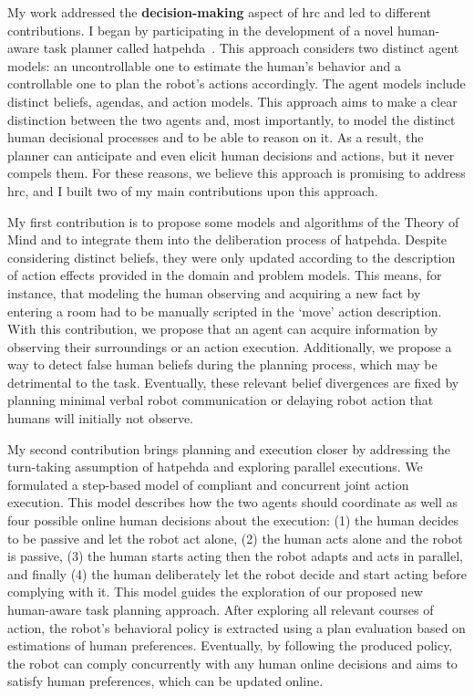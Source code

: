 
My work addressed the \textbf{decision-making} aspect of \acrshort{hrc} and led to different contributions.
I began by participating in the development of a novel human-aware task planner called \acrfull{hatpehda}~\cite{buisan_hatpehda_icra}. This approach considers two distinct agent models: an uncontrollable one to estimate the human's behavior and a controllable one to plan the robot's actions accordingly. The agent models include distinct beliefs, agendas, and action models. This approach aims to make a clear distinction between the two agents and, most importantly, to model the distinct human decisional processes and to be able to reason on it. As a result, the planner can anticipate and even elicit human decisions and actions, but it never compels them. For these reasons, we believe this approach is promising to address \acrshort{hrc}, and I built two of my main contributions upon this approach.

My first contribution is to propose some models and algorithms of the Theory of Mind and to integrate them into the deliberation process of \acrshort{hatpehda}. Despite considering distinct beliefs, they were only updated according to the description of action effects provided in the domain and problem models. This means, for instance, that modeling the human observing and acquiring a new fact by entering a room had to be manually scripted in the `move' action description. With this contribution, we propose that an agent can acquire information by observing their surroundings or an action execution. Additionally, we propose a way to detect false human beliefs during the planning process, which may be detrimental to the task. Eventually, these relevant belief divergences are fixed by planning minimal verbal robot communication or delaying robot action that humans will initially not observe.

My second contribution brings planning and execution closer by addressing the turn-taking assumption of \acrshort{hatpehda} and exploring parallel executions. We formulated a step-based model of compliant and concurrent joint action execution. This model describes how the two agents should coordinate as well as four possible online human decisions about the execution: (1) the human decides to be passive and let the robot act alone, (2) the human acts alone and the robot is passive, (3) the human starts acting then the robot adapts and acts in parallel, and finally (4) the human deliberately let the robot decide and start acting before complying with it. This model guides the exploration of our proposed new human-aware task planning approach. After exploring all relevant courses of action, the robot's behavioral policy is extracted using a plan evaluation based on estimations of human preferences. Eventually, by following the produced policy, the robot can comply concurrently with any human online decisions and aims to satisfy human preferences, which can be updated online.

